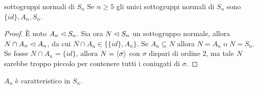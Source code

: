     
    


\begin{proposition}{sottogruppi normali di $S_n$}
    Se $n \geq 5$ gli unici sottogruppi normali di $S_n$ sono $\{id\}, A_n, S_n$.
\end{proposition}
\begin{proof}
    È noto $A_n \vartriangleleft S_n$. Sia ora $N \vartriangleleft S_n$ un sottogruppo normale, allora $N \cap A_n \vartriangleleft A_n$, da cui $N \cap A_n \in \{ \{id\}, A_n \}$. Se $A_n \subseteq N$ allora $N = A_n$ o $N = S_n$. Se fosse $N \cap A_n = \{id\}$, allora $N = \langle \sigma \rangle$ con $\sigma$ dispari di ordine $2$, ma tale $N$ sarebbe troppo piccolo per contenere tutti i coniugati di $\sigma$.
\end{proof}
\begin{corollary2}
    $A_n$ è caratteristico in $S_n$.
\end{corollary2}

